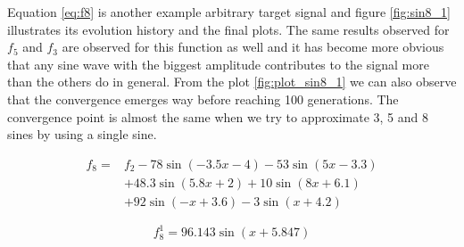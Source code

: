 \documentclass[conference]{IEEEtran}
\begin{document}
Equation \ref{eq:f8} is another example arbitrary target signal and figure \ref{fig:sin8_1} illustrates its evolution history and the final plots. The same results observed for $f_5$ and $f_3$ are observed 
for this function as well and it has become more obvious that any sine wave with the biggest amplitude contributes to the signal more than the others do in general. From the plot \ref{fig:plot_sin8_1} we 
can also observe that the convergence emerges way before reaching 100 generations. The convergence point is almost the same when we try to approximate 3, 5 and 8 sines by using a single sine.

\begin{equation}
	\begin{split}
		f_8 =& f_2 - 78\sin(-3.5x-4) - 53\sin(5x-3.3) \\
			&+ 48.3\sin(5.8x+2) + 10\sin(8x+6.1) \\
			&+ 92\sin(-x+3.6) - 3\sin(x+4.2)
	\end{split}
	\label{eq:f8}
\end{equation}

\begin{equation}
	f_8^1 = 96.143\sin(x+5.847)
	\label{eq:f8_1}
\end{equation}
\end{document}
